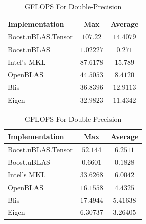 \begin{table}[ht]
    \centering
    \caption{GFLOPS For Single-Precision}
    \begin{tabular}{|l|c|c|}
        \hline
        \textbf{Implementation} & \textbf{Max} & \textbf{Average}\\
        \hline
        Boost.uBLAS.Tensor  & $107.22$& $14.4079$ \\
        \hline
        Boost.uBLAS         & $1.02227$& $0.271$ \\
        \hline
        Intel's MKL         & $87.6178$& $15.789$ \\
        \hline
        OpenBLAS            & $44.5053$& $8.4120$ \\
        \hline
        Blis                & $36.8396$& $12.9113$ \\
        \hline
        Eigen               & $32.9823$& $11.4342$ \\
        \hline
    \end{tabular}

    \vspace*{1 cm}

    \centering
    \caption{GFLOPS For Double-Precision}
    \begin{tabular}{|l|c|c|}
        \hline
        \textbf{Implementation} & \textbf{Max} & \textbf{Average}\\
        \hline
        Boost.uBLAS.Tensor  & $52.144$ & $6.2511$ \\
        \hline
        Boost.uBLAS         & $0.6601$ & $0.1828$ \\
        \hline
        Intel's MKL         & $33.6268$ & $6.0042$ \\
        \hline
        OpenBLAS            & $16.1558$ & $4.4325$ \\
        \hline
        Blis                & $17.4944$ & $5.41638$ \\
        \hline
        Eigen               & $6.30737$ & $3.26405$ \\
        \hline
    \end{tabular}
\end{table}

